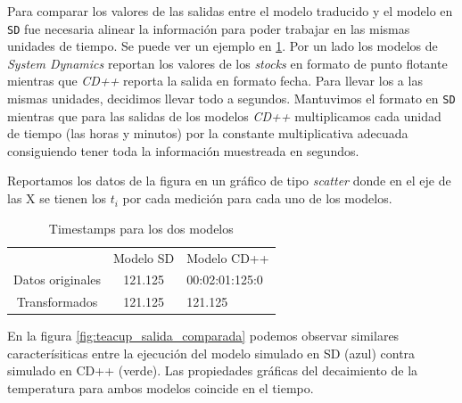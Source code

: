Para comparar los valores de las salidas entre el modelo traducido y el modelo
en \texttt{SD} fue necesaria alinear la información para poder trabajar en las
mismas unidades de tiempo. Se puede ver un ejemplo en \ref{tab:times}. Por un lado los modelos de \textit{System Dynamics} reportan
los valores de los \textit{stocks} en formato de punto flotante mientras que \textit{CD++}
reporta la salida en formato fecha. Para llevar los a las mismas unidades,
decidimos llevar todo a segundos. Mantuvimos el formato en \texttt{SD} mientras que para las salidas de los modelos \textit{CD++} multiplicamos cada unidad de tiempo (las horas y minutos) por la constante multiplicativa adecuada consiguiendo tener toda la información muestreada en segundos.

Reportamos los datos de la figura en un gráfico de tipo \textit{scatter} donde en el eje de las X se tienen los $t_i$ por cada medición para cada uno de los modelos.

\begin{table}[H]
    \centering
    \label{tab:times}
    \begin{tabular}{c | c  l}
        & Modelo SD & Modelo CD++ \\
       Datos originales & 121.125 & 00:02:01:125:0 \\ 
        Transformados & 121.125 & 121.125
    \end{tabular}
    \caption{Timestamps para los dos modelos} 
\end{table}


En la figura \ref{fig:teacup_salida_comparada} podemos observar similares caracterísiticas entre la ejecución del modelo simulado en SD (azul) contra simulado en CD++ (verde). Las propiedades gráficas del decaimiento de la temperatura para ambos modelos coincide en el tiempo.


\begin{figure}[H]
    \centering     %
\end{figure}


